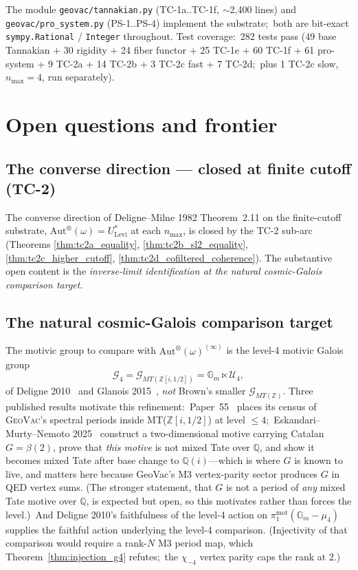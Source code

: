 \documentclass[11pt,a4paper]{article}
\theoremstyle{plain}
\theoremstyle{definition}
\newcommand{\nmax}{n_{\max}}
\newcommand{\Aut}{\mathrm{Aut}}
\newcommand{\Gm}{\mathbb{G}_{m}}
\newcommand{\Q}{\mathbb{Q}}
\newcommand{\Z}{\mathbb{Z}}
\newcommand{\Ulev}{U^{*}_{\mathrm{Levi}}}
\newcommand{\fibfun}{\omega}
\begin{document}
The module \texttt{geovac/tannakian.py} (TC-1a..TC-1f, \(\sim\)2{,}400
lines) and \texttt{geovac/pro\_system.py} (PS-1..PS-4) implement the
substrate;\ both are bit-exact \texttt{sympy.Rational} / \texttt{Integer}
throughout. Test coverage:\ 282 tests pass (49 base Tannakian + 30
rigidity + 24 fiber functor + 25 TC-1e + 60 TC-1f + 61 pro-system
+ 9 TC-2a + 14 TC-2b + 3 TC-2c fast + 7 TC-2d;\ plus 1 TC-2c slow,
$n_{\max} = 4$, run separately).

\section{Open questions and frontier}\label{sec:open}

\subsection{The converse direction --- closed at finite cutoff (TC-2)}\label{sec:open_converse}

The converse direction of Deligne--Milne 1982 Theorem~2.11 on the
finite-cutoff substrate, $\Aut^{\otimes}(\fibfun) = \Ulev$ at each
$\nmax$, is closed by the TC-2 sub-arc (Theorems
\ref{thm:tc2a_equality}, \ref{thm:tc2b_sl2_equality},
\ref{thm:tc2c_higher_cutoff}, \ref{thm:tc2d_cofiltered_coherence}).
The substantive open content is the \emph{inverse-limit
identification at the natural cosmic-Galois comparison target}.

\subsection{The natural cosmic-Galois comparison target}\label{sec:open_g4}

The motivic group to compare with $\Aut^{\otimes}(\fibfun)^{(\infty)}$ is
the level-4 motivic Galois group
\[
\mathcal{G}_4 = \mathcal{G}_{MT(\Z[i, 1/2])} = \Gm \ltimes \mathcal{U}_4,
\]
of Deligne 2010~\cite{deligne2010} and Glanois
2015~\cite{glanois2015}, \emph{not} Brown's smaller
$\mathcal{G}_{MT(\Z)}$. Three published results motivate this
refinement:\ Paper~55~\cite{paper55} places its census of \textsc{GeoVac}'s
spectral periods inside MT($\Z[i, 1/2]$) at level $\le 4$;\
Eskandari--Murty--Nemoto 2025~\cite{eskandari_murty_nemoto2025}
construct a two-dimensional motive carrying Catalan $G = \beta(2)$, prove
that \emph{this motive} is not mixed Tate over $\Q$, and show it becomes
mixed Tate after base change to $\Q(i)$---which is where $G$ is known to
live, and matters here because GeoVac's M3 vertex-parity sector produces $G$
in QED vertex sums.  (The stronger statement, that $G$ is not a period of
\emph{any} mixed Tate motive over $\Q$, is expected but open, so this
motivates rather than forces the level.)\ And Deligne 2010's faithfulness
of the level-4 action on $\pi_1^{\mathrm{mot}}(\Gm - \mu_4)$
supplies the faithful action underlying the level-4 comparison.  (Injectivity
of that comparison would require a rank-$N$ M3 period map, which Theorem~\ref{thm:injection_g4}
refutes;\ the $\chi_{-4}$ vertex parity caps the rank at $2$.)
\end{document}
